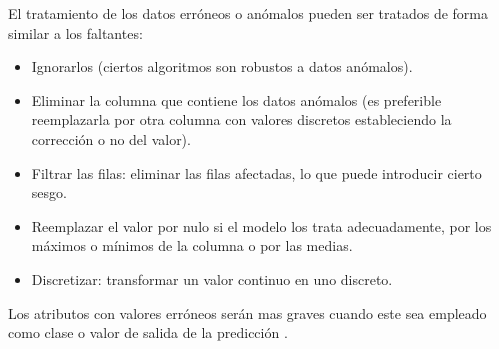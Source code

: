 El tratamiento de los datos erróneos o anómalos pueden ser tratados de forma similar a los faltantes:
\begin{itemize}
    \item Ignorarlos (ciertos algoritmos son robustos a datos anómalos).
    \item Eliminar la columna que contiene los datos anómalos (es preferible reemplazarla por otra columna con valores discretos
        estableciendo la corrección o no del valor).
    \item Filtrar las filas: eliminar las filas afectadas, lo que puede introducir cierto sesgo.
    \item Reemplazar el valor por nulo si el modelo los trata adecuadamente, por los máximos o mínimos de la columna o por
        las medias.
    \item Discretizar: transformar un valor continuo en uno discreto.
\end{itemize}
Los atributos con valores erróneos serán mas graves cuando este sea empleado como clase o valor de salida de la predicción \cite{book:hernandez2004}. 